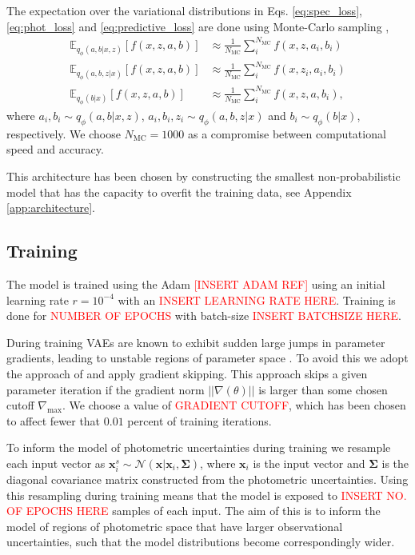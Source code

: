 The expectation over the variational distributions in Eqs. \ref{eq:spec_loss}, \ref{eq:phot_loss} and \ref{eq:predictive_loss} are done using Monte-Carlo sampling \cite{kingmaAutoEncodingVariationalBayes2022, rezendeStochasticBackpropagationApproximate2014},
\begin{align}
    \mathbb{E}_{q_\phi(a,b|x,z)}\left[f(x,z,a,b)\right] &\approx \frac{1}{N_{\text{MC}}} \sum_i^{N_{\text{MC}}} f(x,z,a_i,b_i) \\
    \mathbb{E}_{q_\phi(a,b,z|x)}\left[f(x,z,a,b)\right] &\approx \frac{1}{N_{\text{MC}}} \sum_i^{N_{\text{MC}}} f(x,z_i,a_i,b_i) \\
    \mathbb{E}_{q_\phi(b|x)}\left[f(x,z,a,b)\right] &\approx \frac{1}{N_{\text{MC}}} \sum_i^{N_{\text{MC}}} f(x,z,a,b_i),
\end{align}
where $a_i, b_i \sim q_\phi(a,b|x,z)$, $a_i, b_i, z_i \sim q_\phi(a,b,z|x)$ and $b_i \sim q_\phi(b|x)$, respectively. We choose $N_{\text{MC}} = 1000$ as a compromise between computational speed and accuracy. 

This architecture has been chosen by constructing the smallest non-probabilistic model that has the capacity to overfit the training data, see Appendix \ref{app:architecture}.

\subsection{Training}
\label{subsec:training}

The model is trained using the Adam \textcolor{red}{[INSERT ADAM REF]} using an initial learning rate $r=10^{-4}$ with an \textcolor{red}{INSERT LEARNING RATE HERE}. Training is done for \textcolor{red}{NUMBER OF EPOCHS} with batch-size \textcolor{red}{INSERT BATCHSIZE HERE}. 

During training VAEs are known to exhibit sudden large jumps in parameter gradients, leading to unstable regions of parameter space \cite{childVeryDeepVAEs2021, vahdatNVAEDeepHierarchical2021}. To avoid this we adopt the approach of \cite{childVeryDeepVAEs2021} and apply gradient skipping. This approach skips a given parameter iteration if the gradient norm $||\nabla(\theta)||$ is larger than some chosen cutoff $\nabla_\text{max}$. We choose a value of \textcolor{red}{GRADIENT CUTOFF}, which has been chosen to affect fewer that $0.01$ percent of training iterations.

To inform the model of photometric uncertainties during training we resample each input vector as $\mathbf{x}_i^s \sim \mathcal{N}(\mathbf{x}|\mathbf{x}_i, \boldsymbol{\Sigma})$, where $\mathbf{x}_i$ is the input vector and $\boldsymbol{\Sigma}$ is the diagonal covariance matrix constructed from the photometric uncertainties. Using this resampling during training means that the model is exposed to \textcolor{red}{INSERT NO. OF EPOCHS HERE} samples of each input. The aim of this is to inform the model of regions of photometric space that have larger observational uncertainties, such that the model distributions become correspondingly wider.

